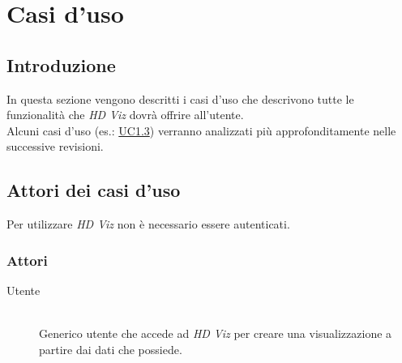 \section{Casi d'uso}
    \subsection{Introduzione}
    In questa sezione vengono descritti i casi d'uso che descrivono tutte le funzionalità che \emph{HD Viz} dovrà offrire all'utente.
    \\
    Alcuni casi d'uso (es.: \hyperref[uc1.3]{UC1.3}) verranno analizzati più approfonditamente nelle successive revisioni. 
    \subsection{Attori dei casi d'uso}
    Per utilizzare \emph{HD Viz} non è necessario essere autenticati.
    \subsubsection{Attori}
    \begin{description}
        \item[Utente] \hfill \\Generico utente che accede ad \emph{HD Viz} per creare una visualizzazione a partire dai dati che possiede.
    \end{description}
    
    \pagebreak
    
    \pagebreak
    
    \pagebreak
    
    \pagebreak
    
    \pagebreak
    
    \pagebreak
    
    \pagebreak
    
    \pagebreak
    
    \pagebreak
    